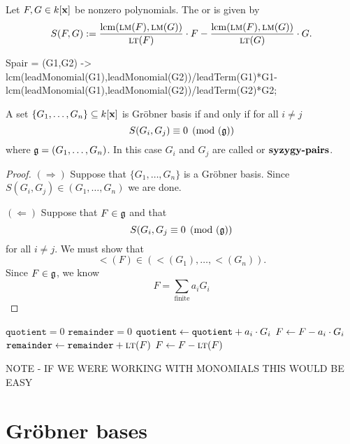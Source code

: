 \documentclass{ximera}
\begin{document}
\begin{definition}
  Let $F,G\in k[\mathbf{x}]$ be nonzero polynomials. The  or
   is given by
  \[
  S(F,G) := \frac{\operatorname{lcm}(\textsc{lm}(F),\textsc{lm}(G))}{\textsc{lt}(F)}\cdot F - \frac{\operatorname{lcm}(\textsc{lm}(F),\textsc{lm}(G))}{\textsc{lt}(G)}\cdot G.
  \]
\end{definition}

\begin{macaulay2}
Spair = (G1,G2) ->
lcm(leadMonomial(G1),leadMonomial(G2))/leadTerm(G1)*G1-
lcm(leadMonomial(G1),leadMonomial(G2))/leadTerm(G2)*G2;
\end{macaulay2}





\begin{theorem}
  A set $\{G_1,\dots,G_n\}\subseteq k[\mathbf{x}]$ is Gr\"obner basis if and
  only if for all $i\ne j$
  \[
  S(G_i,G_j) \equiv 0 \pmod{(\mathfrak g})
  \]
  where $\mathfrak g = (G_1,\dots,G_n)$. In this case $G_i$ and $G_j$ are
  called  or $\dfn{syzygy-pairs}$.
  \begin{proof}
    $(\Rightarrow)$ Suppose that $\{G_1,\dots,G_n\}$ is a Gr\"obner
    basis. Since $S(G_i,G_j)\in (G_1,\dots,G_n)$ we are done.

    $(\Leftarrow)$ Suppose that $F\in \mathfrak g$ and that
    \[
    S(G_i,G_j \equiv 0 \pmod{(\mathfrak g})
    \]
    for all $i\ne j$. We must show that
    \[
    \lt(F) \in (\lt(G_1),\dots, \lt(G_n)).
    \]
    Since $F\in \mathfrak g$, we know
    \[
    F = \sum_{\mathrm{finite}} a_i G_i
    \]
  \end{proof}
\end{theorem}




\begin{algorithm}
  \hfill
  \begin{algorithmic}[1]
    \State $\texttt{quotient} = 0$
    \State $\texttt{remainder} = 0$
    \Repeat
    \State $\texttt{quotient} \leftarrow \texttt{quotient} + a_i\cdot G_i$
    \State $F \leftarrow F - a_i\cdot G_i$
    \Else
    \State $\texttt{remainder} \leftarrow \texttt{remainder} + \textsc{lt}(F)$
    \State $F\leftarrow F- \textsc{lt}(F)$
    \EndIf
  \end{algorithmic}
\end{algorithm}


NOTE - IF WE WERE WORKING WITH MONOMIALS THIS WOULD BE EASY



\section{Gr\"obner bases}
\end{document}
